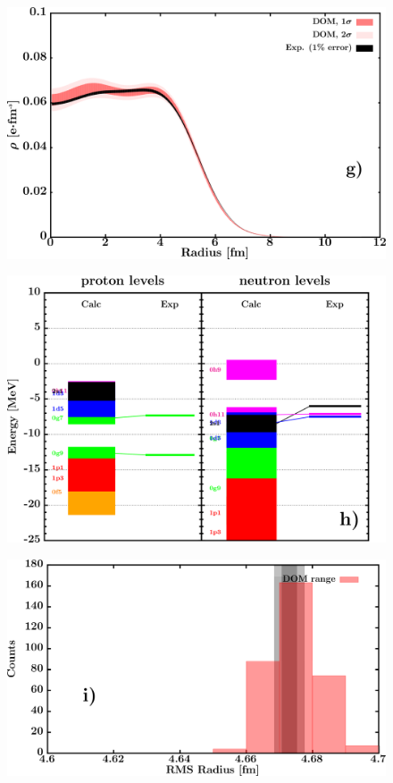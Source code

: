 \documentclass[twocolumn,secnumarabic,amssymb, nobibnotes, aps, prl,
superscriptaddress, nobalancelastpage, draft]{revtex4}
\begin{document}
\begin{figure}[!htb]
\begin{minipage}{0.4\linewidth}
        \includegraphics[width=\linewidth]{figures/sn124_chargeDensity.png}
        \label{DOM_sn124_chargeDensity}
    \end{minipage}\hspace{6pt}
    \begin{minipage}{0.4\linewidth}
        \centering
        \includegraphics[width=\linewidth]{figures/sn124_SPLevels.png}
        \label{DOM_sn124_SPLevels}
    \end{minipage}
    \begin{minipage}{0.4\linewidth}
        \centering
        \includegraphics[width=\linewidth]{figures/sn124_RMSRadius.png}

\end{minipage}
\end{figure}
\end{document}

